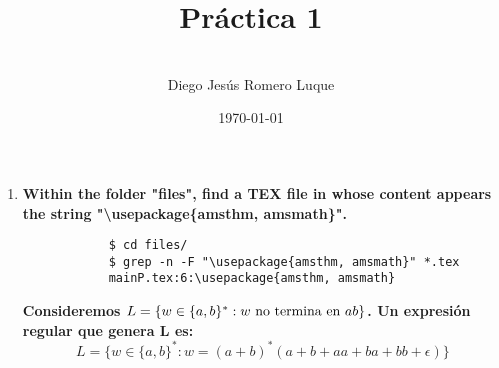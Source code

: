 \documentclass{article}
\title{\textbf{Pr\'actica 1}}
\author{\\Diego Jes\'us Romero Luque}
\date{\today}
\begin{document}
\maketitle
\pagebreak

\begin{enumerate}
    \item \textbf{Within the folder "files", find a TEX file in whose content appears 
           the string "\textbackslash usepackage\{amsthm, amsmath\}".}
        \begin{verbatim}
            $ cd files/
            $ grep -n -F "\usepackage{amsthm, amsmath}" *.tex
            mainP.tex:6:\usepackage{amsthm, amsmath} 
        \end{verbatim}
        \textbf{Consideremos $L=\{w\in \{a,b\}^* : w \textnormal{ no termina en } ab\}$. Un expresión 
         regular que genera L es:} \\
            \begin{equation*}
                L=\{w \in \{a,b\}^* : w=(a+b)^*(a+b+aa+ba+bb+\epsilon)\}
            \end{equation*}
    
    \end{enumerate}
\end{document}
